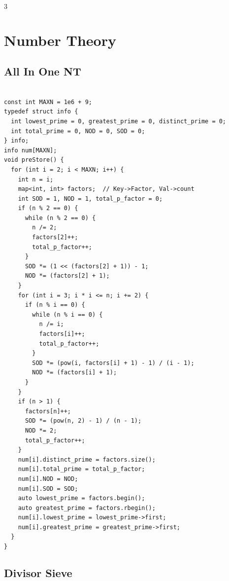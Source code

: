 \documentclass[10pt, landscape, a4paper, onesided]{extarticle}
\begin{document}
\begin{multicols*}{3}
\section{Number Theory}
\subsection{All In One NT}
\begin{verbatim}

const int MAXN = 1e6 + 9;
typedef struct info {
  int lowest_prime = 0, greatest_prime = 0, distinct_prime = 0;
  int total_prime = 0, NOD = 0, SOD = 0;
} info;
info num[MAXN];
void preStore() {
  for (int i = 2; i < MAXN; i++) {
    int n = i;
    map<int, int> factors;  // Key->Factor, Val->count
    int SOD = 1, NOD = 1, total_p_factor = 0;
    if (n % 2 == 0) {
      while (n % 2 == 0) {
        n /= 2;
        factors[2]++;
        total_p_factor++;
      }
      SOD *= (1 << (factors[2] + 1)) - 1;
      NOD *= (factors[2] + 1);
    }
    for (int i = 3; i * i <= n; i += 2) {
      if (n % i == 0) {
        while (n % i == 0) {
          n /= i;
          factors[i]++;
          total_p_factor++;
        }
        SOD *= (pow(i, factors[i] + 1) - 1) / (i - 1);
        NOD *= (factors[i] + 1);
      }
    }
    if (n > 1) {
      factors[n]++;
      SOD *= (pow(n, 2) - 1) / (n - 1);
      NOD *= 2;
      total_p_factor++;
    }
    num[i].distinct_prime = factors.size();
    num[i].total_prime = total_p_factor;
    num[i].NOD = NOD;
    num[i].SOD = SOD;
    auto lowest_prime = factors.begin();
    auto greatest_prime = factors.rbegin();
    num[i].lowest_prime = lowest_prime->first;
    num[i].greatest_prime = greatest_prime->first;
  }
}
\end{verbatim}

\subsection{Divisor Sieve}
\begin{verbatim}


\end{verbatim}
\end{multicols*}
\end{document}
